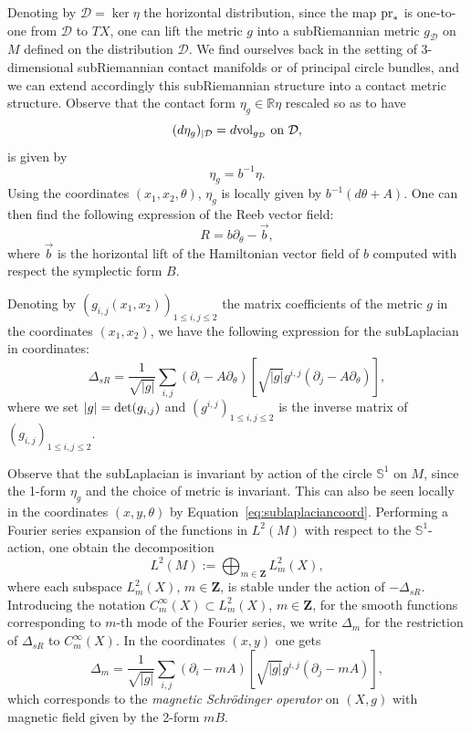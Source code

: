 \documentclass[12pt,a4paper]{amsart}
\theoremstyle{plain}
\theoremstyle{definition}
\theoremstyle{remark}
\numberwithin{equation}{section}
\theoremstyle{definition}
\def\R{{\mathbb R}}%
\def\Z{{\mathbf Z}}%
\def \cD{\mathcal{D}}
\def \bS{\mathbb{S}^{1}}
\def \pr{{\rm pr}}
\numberwithin{equation}{section}
\begin{document}
Denoting by $\cD = \ker\eta$ the horizontal distribution, since the map $\pr_{*}$ is one-to-one from $\cD$ to $TX$, one can lift the metric $g$ into a subRiemannian metric $g_\cD$ on $M$ defined on the distribution $\cD$. We find ourselves back in the setting of 3-dimensional subRiemannian contact manifolds or of principal circle bundles, and we can extend accordingly this subRiemannian structure into a contact metric structure.
Observe that the contact form $\eta_g \in \R \eta$ rescaled so as to have 
\begin{equation*}
    (d\eta_{g})_{|\cD} = d{\rm vol}_{g_\cD}\ \mbox{on}\ \cD,
\end{equation*}
is given by
\begin{equation*}
    \eta_g = b^{-1}\eta.
\end{equation*}
Using the coordinates $(x_1,x_2,\theta)$, $\eta_g$ is locally given by $b^{-1}(d\theta+A)$. One can then find the following expression of the Reeb vector field:
\begin{equation*}
    R = b\partial_\theta - \Vec{b},
\end{equation*}
where $\Vec{b}$ is the horizontal lift of the Hamiltonian vector field of $b$ computed with respect the symplectic form $B$.

Denoting by $(g_{i,j}(x_1,x_2))_{1\leq i,j\leq 2}$ the matrix coefficients of the metric $g$ in the coordinates $(x_1,x_2)$, we have the following expression for the subLaplacian in coordinates:
\begin{equation}
    \label{eq:sublaplaciancoord}
    \Delta_{sR} = \frac{1}{\sqrt{|g|}}\sum_{i,j} (\partial_i - A\partial_\theta)[\sqrt{|g|}g^{i,j}(\partial_j - A\partial_\theta)],
\end{equation}
where we set $|g| = {\rm det}(g_{i,j})$ and $(g^{i,j})_{1\leq i,j\leq 2}$ is the inverse matrix of $(g_{i,j})_{1\leq i,j\leq 2}$.

Observe that the subLaplacian is invariant by action of the circle $\bS$ on $M$, since the 1-form $\eta_g$ and the choice of metric is invariant. This can also be seen locally in the coordinates $(x,y,\theta)$ by Equation~\eqref{eq:sublaplaciancoord}.
Performing a Fourier series expansion of the functions in $L^2(M)$ with respect to the $\bS$-action, one obtain the decomposition
\begin{equation*}
    L^2(M) := \bigoplus_{m\in\Z} L_{m}^2(X),
\end{equation*}
where each subspace $L_{m}^2(X)$, $m\in\Z$, is stable under the action of $-\Delta_{sR}$. Introducing the notation $C_{m}^\infty(X)\subset L_{m}^2(X)$, $m\in\Z$, for the smooth functions corresponding to $m$-th mode of the Fourier series, we write $\Delta_m$ for the restriction of $\Delta_{sR}$ to $C_{m}^\infty(X)$. In the coordinates $(x,y)$ one gets
\begin{equation*}
    \Delta_m = \frac{1}{\sqrt{|g|}}\sum_{i,j} (\partial_i - m A)[\sqrt{|g|}g^{i,j}(\partial_j - m A)],
\end{equation*}
which corresponds to the \emph{magnetic Schrödinger operator} on $(X,g)$ with magnetic field given by the 2-form $m B$.
\end{document}
